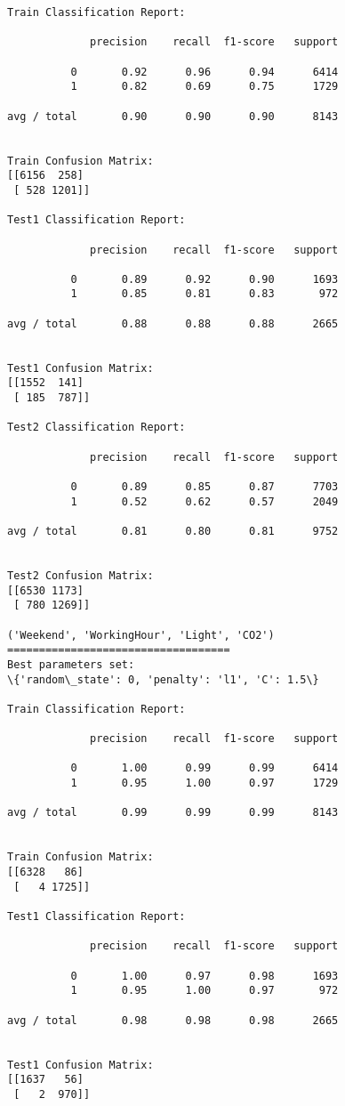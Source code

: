 \documentclass[11pt]{article}
\begin{document}
\begin{Verbatim}[commandchars=\\\{\}]
Train Classification Report:

             precision    recall  f1-score   support

          0       0.92      0.96      0.94      6414
          1       0.82      0.69      0.75      1729

avg / total       0.90      0.90      0.90      8143


Train Confusion Matrix:
[[6156  258]
 [ 528 1201]]

Test1 Classification Report:

             precision    recall  f1-score   support

          0       0.89      0.92      0.90      1693
          1       0.85      0.81      0.83       972

avg / total       0.88      0.88      0.88      2665


Test1 Confusion Matrix:
[[1552  141]
 [ 185  787]]

Test2 Classification Report:

             precision    recall  f1-score   support

          0       0.89      0.85      0.87      7703
          1       0.52      0.62      0.57      2049

avg / total       0.81      0.80      0.81      9752


Test2 Confusion Matrix:
[[6530 1173]
 [ 780 1269]]

('Weekend', 'WorkingHour', 'Light', 'CO2')
===================================
Best parameters set:
\{'random\_state': 0, 'penalty': 'l1', 'C': 1.5\}

Train Classification Report:

             precision    recall  f1-score   support

          0       1.00      0.99      0.99      6414
          1       0.95      1.00      0.97      1729

avg / total       0.99      0.99      0.99      8143


Train Confusion Matrix:
[[6328   86]
 [   4 1725]]

Test1 Classification Report:

             precision    recall  f1-score   support

          0       1.00      0.97      0.98      1693
          1       0.95      1.00      0.97       972

avg / total       0.98      0.98      0.98      2665


Test1 Confusion Matrix:
[[1637   56]
 [   2  970]]


\end{Verbatim}
\end{document}
